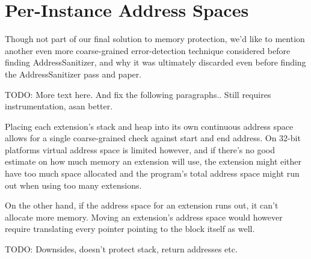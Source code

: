 \section {Per-Instance Address Spaces}

Though not part of our final solution to memory protection, we'd like to mention
another even more coarse-grained error-detection technique considered before
finding AddressSanitizer, and why it was ultimately discarded even before
finding the AddressSanitizer pass and paper.

TODO: More text here. And fix the following paragraphs.. Still requires
instrumentation, asan better.

Placing each extension's stack and heap into its own continuous address space
allows for a single coarse-grained check against start and end address. On
32-bit platforms virtual address space is limited however, and if there's no
good estimate on how much memory an extension will use, the extension might
either have too much space allocated and the program's total address space
might run out when using too many extensions.

On the other hand, if the address space for an extension runs out, it can't
allocate more memory. Moving an extension's address space would however require
translating every pointer pointing to the block itself as well.

TODO: Downsides, doesn't protect stack, return addresses etc.

